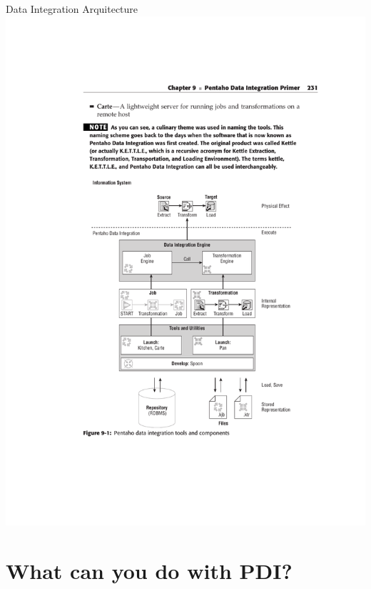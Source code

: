 \documentclass[aspectratio=169]{beamer}
\begin{document}
\begin{frame}{Data Integration Arquitecture}
    \centering
    \includegraphics[width=0.95\textheight, trim={3cm 5.55cm 3cm 10cm}, clip]{figures/pdi_architecture}
\end{frame}

\section{What can you do with PDI?}
\end{document}
